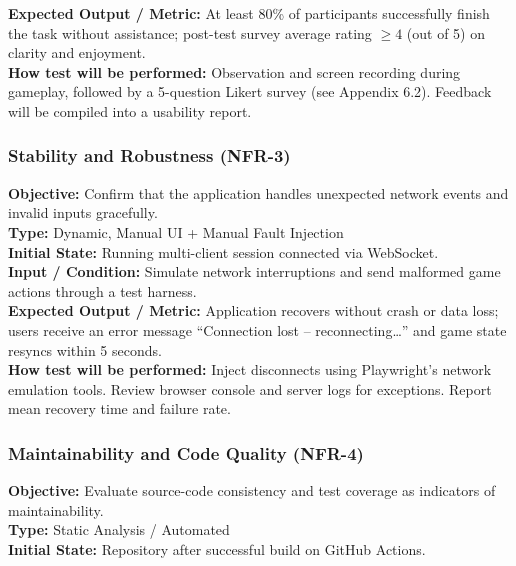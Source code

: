 \documentclass[12pt, titlepage]{article}
\begin{document}
    \textbf{Expected Output / Metric:} At least 80\% of participants successfully finish the task without assistance; post-test survey average rating $\geq 4$ (out of 5) on clarity and enjoyment. \\

    \textbf{How test will be performed:}
    Observation and screen recording during gameplay, followed by a 5-question Likert survey (see Appendix 6.2).
    Feedback will be compiled into a usability report.

    \subsubsection{Stability and Robustness (NFR-3)}
    \textbf{Objective:} Confirm that the application handles unexpected network events and invalid inputs gracefully. \\

    \textbf{Type:} Dynamic, Manual UI + Manual Fault Injection \\

    \textbf{Initial State:} Running multi-client session connected via WebSocket. \\

    \textbf{Input / Condition:} Simulate network interruptions and send malformed game actions through a test harness. \\

    \textbf{Expected Output / Metric:} Application recovers without crash or data loss; users receive an error message ``Connection lost – reconnecting…'' and game state resyncs within 5 seconds. \\

    \textbf{How test will be performed:}
    Inject disconnects using Playwright’s network emulation tools. Review browser console and server logs for exceptions. Report mean recovery time and failure rate.

    \subsubsection{Maintainability and Code Quality (NFR-4)}
    \textbf{Objective:} Evaluate source-code consistency and test coverage as indicators of maintainability. \\

    \textbf{Type:} Static Analysis / Automated \\

    \textbf{Initial State:} Repository after successful build on GitHub Actions. \\
\end{document}
